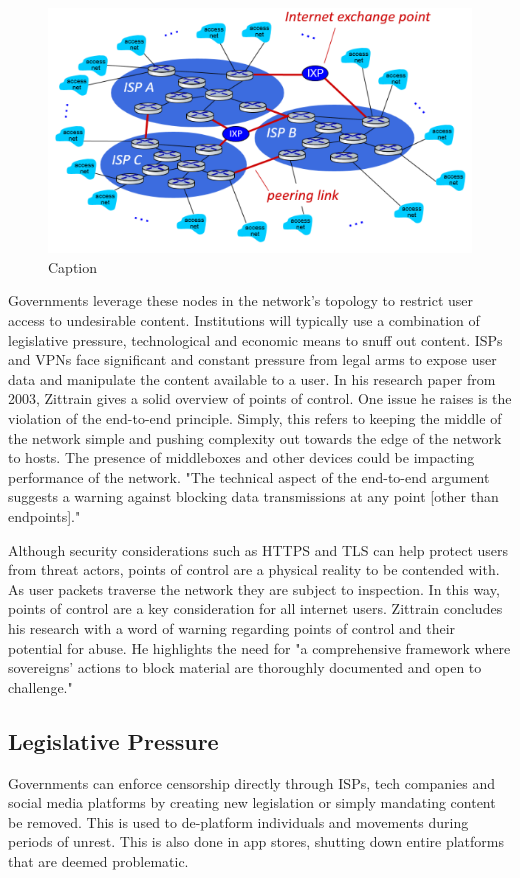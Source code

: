 \begin{figure}
    \centering
    \includegraphics[width=0.5\linewidth]{State of the Art/KuroseISPs.png}
    \caption{Caption}
    \label{fig:enter-label}
\end{figure}

Governments leverage these nodes in the network's topology to restrict user access to undesirable content.  Institutions will typically use a combination of legislative pressure, technological and economic means to snuff out content. ISPs and VPNs face significant and constant pressure from legal arms to expose user data and manipulate the content available to a user. In his research paper from 2003, Zittrain gives a solid overview of points of control. One issue he raises is the violation of the end-to-end principle. Simply, this refers to keeping the middle of the network simple and pushing complexity out towards the edge of the network to hosts. The presence of middleboxes and other devices could be impacting performance of the network. "The technical aspect of the end-to-end argument suggests a warning against blocking data transmissions at any point [other than endpoints]." \cite{Zittrain_Internet_Points_of_Control} 

Although security considerations such as HTTPS and TLS can help protect users from threat actors, points of control are a physical reality to be contended with. As user packets traverse the network they are subject to inspection. In this way, points of control are a key consideration for all internet users. Zittrain concludes his research with a word of warning regarding points of control and their potential for abuse. He highlights the need for "a comprehensive framework where sovereigns’ actions to block material are thoroughly documented and open to challenge." \cite{Zittrain_Internet_Points_of_Control} 

\subsection{Legislative Pressure}
Governments can enforce censorship directly through ISPs, tech companies and social media platforms by creating new legislation or simply mandating content be removed. This is used to de-platform individuals and movements during periods of unrest. This is also done in app stores, shutting down entire platforms that are deemed problematic.

